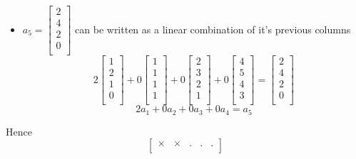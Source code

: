 \documentclass{article}
\begin{document}
\begin{itemize}
  \item $a_5=
          \begin{bmatrix}
            2 \\
            4 \\
            2 \\
            0 \\
          \end{bmatrix}
        $ can be written as a linear combination of it's previous columns
        $$
          2\begin{bmatrix}
            1 \\
            2 \\
            1 \\
            0 \\
          \end{bmatrix}+0\begin{bmatrix}
            1 \\
            1 \\
            1 \\
            1 \\
          \end{bmatrix}+0\begin{bmatrix}
            2 \\
            3 \\
            2 \\
            1 \\
          \end{bmatrix}+0\begin{bmatrix}
            4 \\
            5 \\
            4 \\
            3 \\
          \end{bmatrix}=\begin{bmatrix}
            2 \\
            4 \\
            2 \\
            0 \\
          \end{bmatrix}
        $$
        $$
          2a_1+0a_2+0a_3+0a_4=a_5
        $$
\end{itemize}
Hence\\
$$
  \begin{bmatrix}
    \times & \times & . & . & . \\
  \end{bmatrix}
$$
\end{document}
